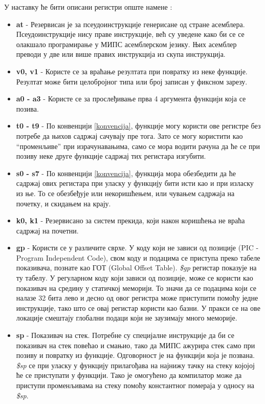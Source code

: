 \documentclass[12pt,oneside]{memoir}
\begin{document}
У наставку ће бити описани регистри опште намене \cite{mips}:

\begin{itemize}
\item \textbf{at} - Резервисан је за псеудоинструкције генерисане од стране асемблера. Псеудоинструкције нису праве инструкције, већ су уведене како би се се олакшало програмирање у МИПС асемблерском језику. Њих асемблер преводи у две или више правих инструкција из скупа инструкција.

\item \textbf{v0, v1} - Користе се за враћање резултата при повратку из неке функције. Резултат може бити целобројног типа или број записан у фиксном зарезу.

\item \textbf{a0 - a3} - Користе се за прослеђивање прва 4 аргумента функцији која се позива. 

\item \textbf{t0 - t9} - По конвенцији \ref{konvencija}, функције могу користи ове регистре без потребе да њихов садржај сачувају пре тога. Зато се могу користити као “променљиве” при израчунавањима, само се мора водити рачуна да ће се при позиву неке друге функције садржај тих регистара изгубити.

\item \textbf{s0 - s7} - По конвенцији \ref{konvencija}, функција мора обезбедити да ће садржај ових регистара при уласку у функцију бити исти као и при изласку из ње. То се обезбеђује или некоришћењем, или чувањем садржаја на почетку, и скидањем на крају.

\item \textbf{k0, k1} - Резервисано за систем прекида, који након коришћења не враћа садржај на почетни.

\item \textbf{gp} - Користи се у различите сврхе. У коду који не зависи од позиције (PIC - Program Independent Code), свом коду и подацима се приступа преко табеле показивача, познате као ГОТ (Global Offset Table). \textit{\$gp} регистар показује на ту табелу.
У регуларном коду који зависи од позиције, може се користи као показивач на средину у статичкој меморији. То значи да се подацима који се налазе 32 бита лево и десно од овог регистра може приступити помоћу једне инструкције, тако што се овај регистар користи као базни. У пракси се на ове локације смештају глобални подаци који не заузимају много меморије.

\item \textbf{sp} - Показивач на стек. Потребне су специјалне инструкције да би се показивач на стек повећао и смањио, тако да МИПС ажурира стек само при позиву и повратку из функције. Одговорност је на функцији која је позвана. \textit{\$sp} се при уласку у функцију прилагођава на најнижу тачку на стеку којојој ће се приступати у функцији. Тако је омогућено да компилатор може да приступи променљивама на стеку помоћу константног помераја у односу на \textit{\$sp}.


\end{itemize}
\end{document}
